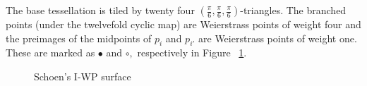 \documentclass[12pt,reqno]{amsart}
\DeclareMathOperator{\Aut}{Aut}
\theoremstyle{definition}
\theoremstyle{remark}
\begin{document}
The base tessellation is tiled by twenty four $(\frac{\pi}{6}, \frac{\pi}{6}, \frac{\pi}{6})$-triangles. The branched points (under the twelvefold cyclic map) are Weierstrass points of weight four and the preimages of the midpoints of $p_i$ and $p_{i'}$ are Weierstrass points of weight one. These are marked as $\bullet$ and $\circ,$ respectively in Figure~ \cref{fig:147}. 

\begin{figure}[htbp]
    \centering
    \qquad
    \qquad
    \caption{Schoen's I-WP surface}
    \label{fig:147}%
\end{figure}

\end{document}
